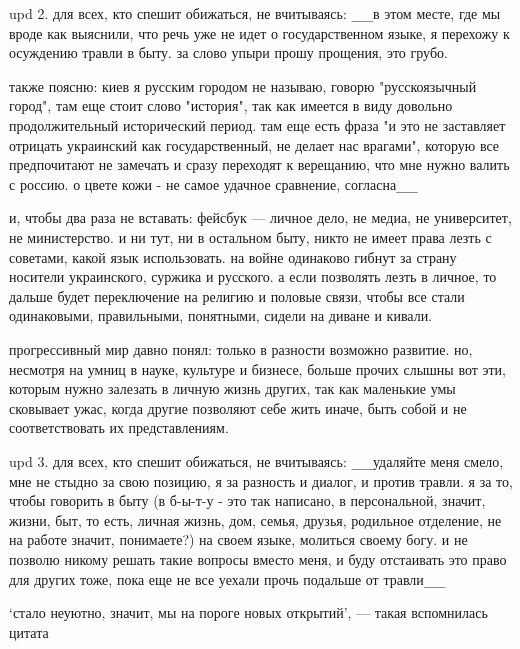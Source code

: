 upd 2. для всех, кто спешит обижаться, не вчитываясь: \verb|___|в этом месте,
где мы вроде как выяснили, что речь уже не идет о государственном языке, я
перехожу к осуждению травли в быту. за слово упыри прошу прощения, это грубо. 

также поясню: киев я русским городом не называю, говорю "русскоязычный город",
там еще стоит слово "история", так как имеется в виду довольно продолжительный
исторический период. там еще есть фраза "и это не заставляет отрицать
украинский как государственный, не делает нас врагами", которую все
предпочитают не замечать и сразу переходят к верещанию, что мне нужно валить с
россию. о цвете кожи - не самое удачное сравнение, согласна\verb|___|

и, чтобы два раза не вставать: фейсбук — личное дело, не медиа, не университет,
не министерство. и ни тут, ни в остальном быту, никто не имеет права лезть с
советами, какой язык использовать. на войне одинаково гибнут за страну носители
украинского, суржика и русского. а если позволять лезть в личное, то дальше
будет переключение на религию и половые связи, чтобы все стали одинаковыми,
правильными, понятными, сидели на диване и кивали.

прогрессивный мир давно понял: только в разности возможно развитие. но,
несмотря на умниц в науке, культуре и бизнесе, больше прочих слышны вот эти,
которым нужно залезать в личную жизнь других, так как маленькие умы сковывает
ужас, когда другие позволяют себе жить иначе, быть собой и не соответствовать
их представлениям.

upd 3. для всех, кто спешит обижаться, не вчитываясь: \verb|___|удаляйте меня
смело, мне не стыдно за свою позицию, я за разность и диалог, и против травли.
я за то, чтобы говорить в быту (в б-ы-т-у - это так написано, в персональной,
значит, жизни, быт, то есть, личная жизнь, дом, семья, друзья, родильное
отделение, не на работе значит, понимаете?) на своем языке, молиться своему
богу. и не позволю никому решать такие вопросы вместо меня, и буду отстаивать
это право для других тоже, пока еще не все уехали прочь подальше от травли\verb|___|

‘стало неуютно, значит, мы на пороге новых открытий’, — такая вспомнилась
цитата
